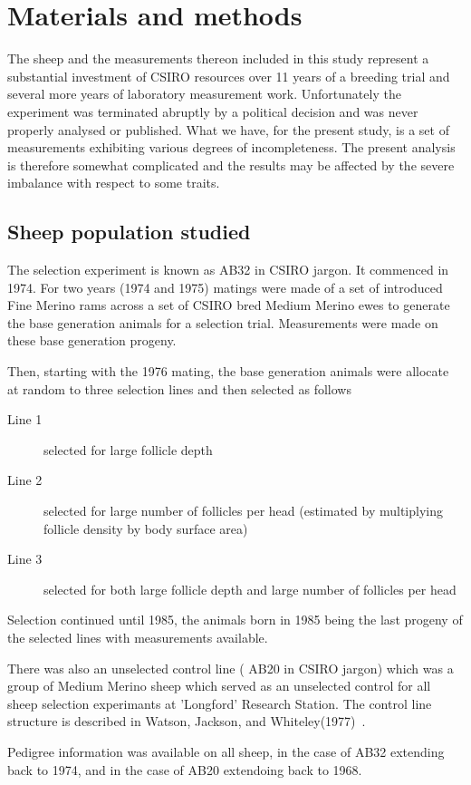 \documentclass[titlepage]{article}  %
\begin{document}
\section{Materials and methods}
The sheep and the measurements thereon included in this study represent a substantial investment of CSIRO resources over 11 years of a breeding trial and several more years of laboratory measurement work. Unfortunately the experiment was terminated abruptly by a political decision and was never properly analysed or published. What we have, for the present study, is a set of measurements exhibiting various degrees of incompleteness. The present analysis is therefore somewhat complicated and the results may be affected by the severe imbalance with respect to some traits.

\subsection{ Sheep population studied}
The selection experiment is known as AB32 in CSIRO jargon. It commenced in 1974. For two years (1974 and 1975) matings were made of a set of introduced Fine Merino rams across a set of CSIRO bred Medium Merino ewes to generate the base generation animals for a selection trial. Measurements were made on these base generation progeny.

Then, starting with the 1976 mating, the base generation animals were allocate at random to three selection lines and then selected as follows
\begin{description}
\item[Line 1] selected for large follicle depth
\item[Line 2] selected for large number of follicles per head (estimated by multiplying follicle density by body surface area)
\item[Line 3] selected for both large follicle depth and large number of follicles per head
\end{description}
Selection continued until 1985, the animals born in 1985 being the last progeny of the selected lines with measurements available.

There was also an unselected control line ( AB20 in CSIRO jargon) which was a group of Medium Merino sheep which served as an unselected control for all sheep selection experimants at 'Longford' Research Station. The control line structure is described in Watson, Jackson, and Whiteley(1977)~\cite{wats:77}.

Pedigree information was available on all sheep, in the case of AB32 extending back to 1974, and in the case of AB20 extendoing back to 1968.
\end{document}
